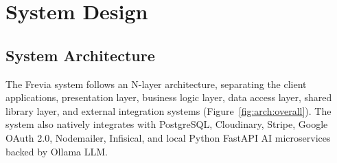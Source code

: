 \section{System Design}

\subsection{System Architecture}

The Frevia system follows an N-layer architecture, separating the client applications, presentation layer, business logic layer, data access layer, shared library layer, and external integration systems (Figure~\ref{fig:arch:overall}). The system also natively integrates with PostgreSQL, Cloudinary, Stripe, Google OAuth 2.0, Nodemailer, Infisical, and local Python FastAPI AI microservices backed by Ollama LLM.


